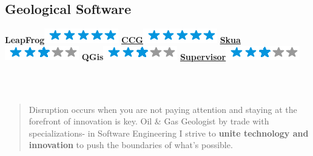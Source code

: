 \documentclass[]{friggeri-cv}
\begin{document}
\begin{aside}
  \section{Geological Software}
	\textbf{LeapFrog}\includegraphics[scale=0.40]{img/5stars.png}
	\href{http://www.ccgalberta.com/}{\textbf{CCG}}\includegraphics[scale=0.40]{img/5stars.png}
	\href{http://www.pdgm.com/products/skua-gocad/}{\textbf{Skua}}\includegraphics[scale=0.40]{img/3stars.png}
	\textbf{QGis}\includegraphics[scale=0.40]{img/3stars.png}
	\href{https://snowdengroup.com/software/supervisor/}{\textbf{Supervisor}}\includegraphics[scale=0.40]{img/3stars.png}
	~
    ~
\end{aside}
~
\begin{quote}
\large	
Disruption occurs when you are not paying attention and staying at the forefront of innovation is key. Oil \& Gas Geologist by trade with specializations- in Software Engineering I strive to \textbf{unite technology and innovation} to push the boundaries of what’s possible.
\end{quote}
\end{document}
